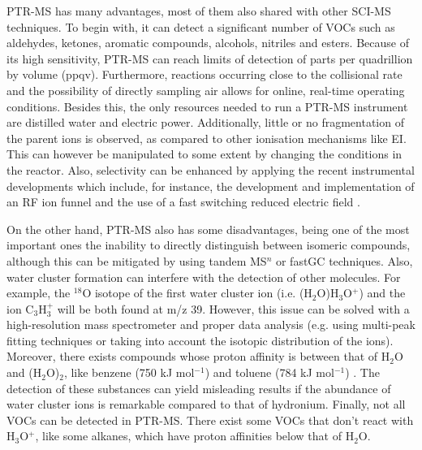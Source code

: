 PTR-MS has many advantages, most of them also shared with other SCI-MS techniques. To begin with, it can detect a significant number of  VOCs such as aldehydes, ketones, aromatic compounds, alcohols,  nitriles and esters.
Because of its high sensitivity, PTR-MS can reach limits of detection of parts per quadrillion by volume (\acrshort{ppqv}). %
Furthermore, reactions occurring close to the collisional rate and the possibility of directly sampling air allows for online, real-time operating conditions. Besides this, the only resources needed to run a PTR-MS instrument are distilled water and electric power.
Additionally, little or no fragmentation of the parent ions is observed, as compared to other ionisation mechanisms like EI. This  can however be manipulated to some extent by changing the conditions in the reactor. Also, selectivity can be enhanced by applying the recent instrumental developments which include, for instance, the development and implementation of an RF ion funnel  and the use of a fast switching reduced electric field \cite{barber2012increased,RF_TNT,doi:10.1021/acs.analchem.7b05211}.

On the other hand, PTR-MS also has some disadvantages, being one of the most important ones the inability to directly distinguish between isomeric compounds, although this can be mitigated by using tandem MS$^n$ or fastGC techniques. %
Also, water cluster formation can interfere with the detection of other molecules. For example, the $^{18}$O isotope of the first water cluster ion (i.e. (H$_2$O)H$_3$O$^+$) and the ion C$_3$H$_3^+$ will  be both found at m/z 39. However, this issue can be solved with a high-resolution mass spectrometer and proper data analysis (e.g. using multi-peak fitting techniques or taking into account the isotopic distribution of the ions).
%
Moreover, there exists compounds whose proton affinity is between that of H$_2$O and (H$_2$O)$_2$, like benzene (750 kJ mol$^{-1}$) and toluene (784 kJ mol$^{-1}$) \cite{doi:10.1063/1.556018}.
%
The detection of these substances can yield misleading results if the abundance of water cluster ions is remarkable compared to that of hydronium.
%
Finally, not all VOCs can be detected in PTR-MS. There exist some VOCs that don’t react with H$_3$O$^+$, like some alkanes, which have proton affinities below that of H$_2$O.












